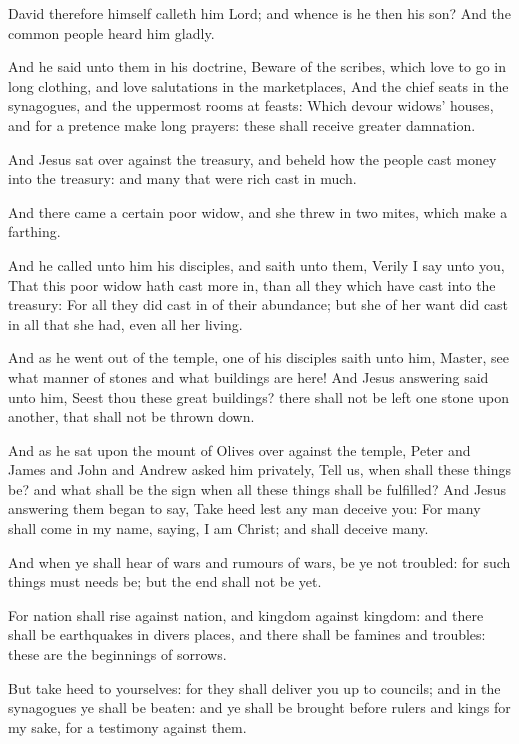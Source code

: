 \Verse David therefore himself calleth him Lord; and whence is he then his son? And the common people heard him gladly.

\Verse And he said unto them in his doctrine, Beware of the scribes, which love to go in long clothing, and love salutations in the marketplaces, \Verse And the chief seats in the synagogues, and the uppermost rooms at feasts: \Verse Which devour widows' houses, and for a pretence make long prayers: these shall receive greater damnation.

\Verse And Jesus sat over against the treasury, and beheld how the people cast money into the treasury: and many that were rich cast in much.

\Verse And there came a certain poor widow, and she threw in two mites, which make a farthing.

\Verse And he called unto him his disciples, and saith unto them, Verily I say unto you, That this poor widow hath cast more in, than all they which have cast into the treasury: \Verse For all they did cast in of their abundance; but she of her want did cast in all that she had, even all her living.


\Chapter
\Verse And as he went out of the temple, one of his disciples saith unto him, Master, see what manner of stones and what buildings are here!  \Verse And Jesus answering said unto him, Seest thou these great buildings?  there shall not be left one stone upon another, that shall not be thrown down.

\Verse And as he sat upon the mount of Olives over against the temple, Peter and James and John and Andrew asked him privately, \Verse Tell us, when shall these things be? and what shall be the sign when all these things shall be fulfilled?  \Verse And Jesus answering them began to say, Take heed lest any man deceive you: \Verse For many shall come in my name, saying, I am Christ; and shall deceive many.

\Verse And when ye shall hear of wars and rumours of wars, be ye not troubled: for such things must needs be; but the end shall not be yet.

\Verse For nation shall rise against nation, and kingdom against kingdom: and there shall be earthquakes in divers places, and there shall be famines and troubles: these are the beginnings of sorrows.

\Verse But take heed to yourselves: for they shall deliver you up to councils; and in the synagogues ye shall be beaten: and ye shall be brought before rulers and kings for my sake, for a testimony against them.

